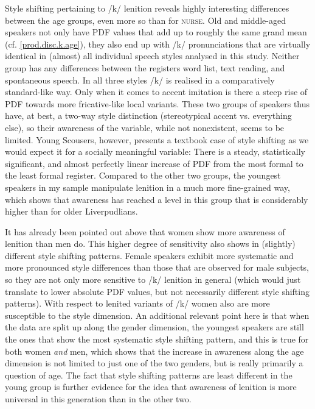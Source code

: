 Style shifting pertaining to /k/ lenition reveals highly interesting differences between the age groups, even more so than for \textsc{nurse}.
Old and middle-aged speakers not only have PDF values that add up to roughly the same grand mean (cf. \ref{prod.disc.k.age}), they also end up with /k/ pronunciations that are virtually identical in (almost) all individual speech styles analysed in this study.
Neither group has any differences between the registers word list, text reading, and spontaneous speech.
In all three styles /k/ is realised in a comparatively standard-like way.
Only when it comes to accent imitation is there a steep rise of PDF towards more fricative-like local variants.
These two groups of speakers thus have, at best, a two-way style distinction (stereotypical accent vs. everything else), so their awareness of the variable, while not nonexistent, seems to be limited.
Young Scousers, however, presents a textbook case of style shifting as we would expect it for a socially meaningful variable: There is a steady, statistically significant, and almost perfectly linear increase of PDF from the most formal to the least formal register.
Compared to the other two groups, the youngest speakers in my sample manipulate lenition in a much more fine-grained way, which shows that awareness has reached a level in this group that is considerably higher than for older Liverpudlians.

It has already been pointed out above that women show more awareness of lenition than men do.
This higher degree of sensitivity also shows in (slightly) different style shifting patterns.
Female speakers exhibit more systematic and more pronounced style differences than those that are observed for male subjects, so they are not only more sensitive to /k/ lenition in general (which would just translate to lower absolute PDF values, but not necessarily different style shifting patterns).
With respect to lenited variants of /k/ women also are more susceptible to the style dimension.
An additional relevant point here is that when the data are split up along the gender dimension, the youngest speakers are still the ones that show the most systematic style shifting pattern, and this is true for both women \emph{and} men, which shows that the increase in awareness along the age dimension is not limited to just one of the two genders, but is really primarily a question of age.
The fact that style shifting patterns are least different in the young group is further evidence for the idea that awareness of lenition is more universal in this generation than in the other two.

